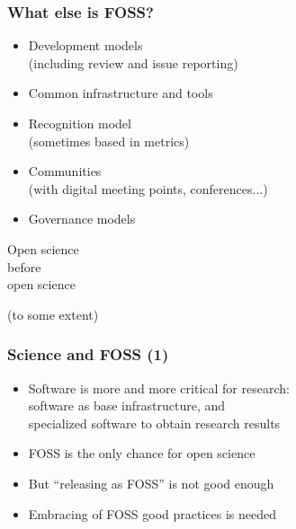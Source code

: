 \documentclass[17pt,aspectratio=169,hyperref={pdfusetitle,colorlinks,allcolors=olive}]{beamer}
\begin{document}
\begin{frame}[fragile]
  \frametitle{What else is FOSS?}

  \begin{itemize}
  \item Development models \\
  (including review and issue reporting)

  \item Common infrastructure and tools

  \item Recognition model \\
    (sometimes based in metrics)

  \item Communities \\
    (with digital meeting points, conferences...)

  \item Governance models
  \end{itemize}

\end{frame}

\begin{frame}[fragile]

  \begin{center}
    {\Huge
      Open science \\
      before \\
      open science \\
    }

    \vspace{1cm}

    (to some extent)
  \end{center}
\end{frame}

\begin{frame}[fragile]
  \frametitle{Science and FOSS (1)}

  \begin{itemize}
  \item Software is more and more critical for research: \\
    software as base infrastructure, and \\
    specialized software to obtain research results
  \item FOSS is the only chance for open science
  \item But ``releasing as FOSS'' is not good enough
  \item Embracing of FOSS good practices is needed
  \end{itemize}

\end{frame}
\end{document}
